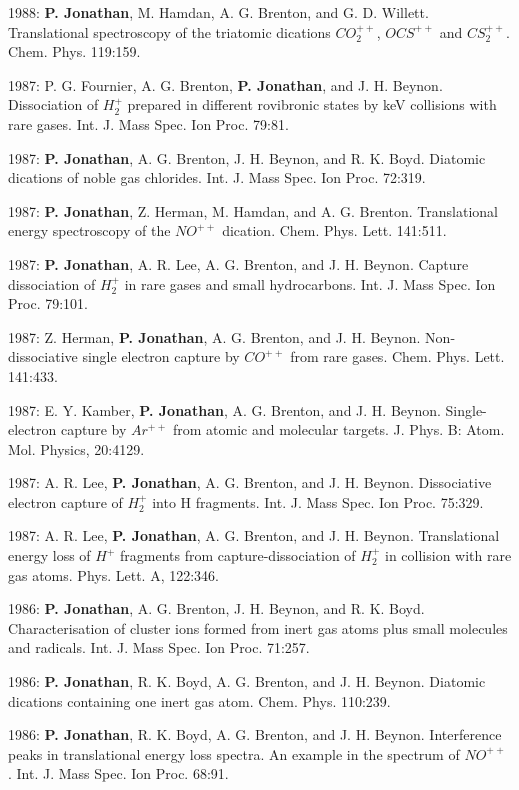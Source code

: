 \documentclass[11pt,a4paper]{moderncv}
\begin{document}
1988: \textbf{P. Jonathan}, M. Hamdan, A. G. Brenton, and G. D. Willett. Translational spectroscopy of the triatomic dications $CO_2^{++}$, $OCS^{++}$ and $CS_2^{++}$. Chem. Phys. 119:159.

1987: P. G. Fournier, A. G. Brenton, \textbf{P. Jonathan}, and J. H. Beynon. Dissociation of $H_2^+$ prepared in different rovibronic states by keV collisions with rare gases. Int. J. Mass Spec. Ion Proc. 79:81.

1987: \textbf{P. Jonathan}, A. G. Brenton, J. H. Beynon, and R. K. Boyd. Diatomic dications of noble gas chlorides. Int. J. Mass Spec. Ion Proc. 72:319.

1987: \textbf{P. Jonathan}, Z. Herman, M. Hamdan, and A. G. Brenton. Translational energy spectroscopy of the $NO^{++}$ dication. Chem. Phys. Lett. 141:511.

1987: \textbf{P. Jonathan}, A. R. Lee, A. G. Brenton, and J. H. Beynon. Capture dissociation of $H_2^+$ in rare gases and small hydrocarbons. Int. J. Mass Spec. Ion Proc. 79:101.

1987: Z. Herman, \textbf{P. Jonathan}, A. G. Brenton, and J. H. Beynon. Non-dissociative single electron capture by $CO^{++}$ from rare gases. Chem. Phys. Lett. 141:433.

1987: E. Y. Kamber, \textbf{P. Jonathan}, A. G. Brenton, and J. H. Beynon. Single-electron capture by $Ar^{++}$ from atomic and molecular targets. J. Phys. B: Atom. Mol. Physics, 20:4129.

1987: A. R. Lee, \textbf{P. Jonathan}, A. G. Brenton, and J. H. Beynon. Dissociative electron capture of $H_2^+$ into H fragments. Int. J. Mass Spec. Ion Proc. 75:329.

1987: A. R. Lee, \textbf{P. Jonathan}, A. G. Brenton, and J. H. Beynon. Translational energy loss of $H^+$ fragments from capture-dissociation of $H_2^+$ in collision with rare gas atoms. Phys. Lett. A, 122:346.

1986: \textbf{P. Jonathan}, A. G. Brenton, J. H. Beynon, and R. K. Boyd. Characterisation of cluster ions formed from inert gas atoms plus small molecules and radicals. Int. J. Mass Spec. Ion Proc. 71:257.

1986: \textbf{P. Jonathan}, R. K. Boyd, A. G. Brenton, and J. H. Beynon. Diatomic dications containing one inert gas atom. Chem. Phys. 110:239.

1986: \textbf{P. Jonathan}, R. K. Boyd, A. G. Brenton, and J. H. Beynon. Interference peaks in translational energy loss spectra. An example in the spectrum of $NO^{++}$ . Int. J. Mass Spec. Ion Proc. 68:91.
\end{document}
